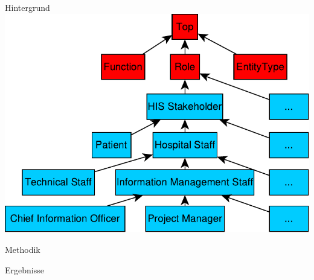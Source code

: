 \documentclass[portrait,final,a0paper,fontscale=0.320]{imiseposter}
\begin{document}
\begin{poster}
\begin{posterbox}[name=background,column=0,row=0]{Hintergrund}
\includegraphics[width=0.5\linewidth]{../Dokumentation/Images/hierarchy.pdf}

\blindtext
\end{posterbox}
\begin{posterbox}[name=methods,below=background]{Methodik}
\blindtext
\end{posterbox}
\begin{posterbox}[name=results,column=1]{Ergebnisse}
  

\end{posterbox}
\end{poster}
\end{document}
